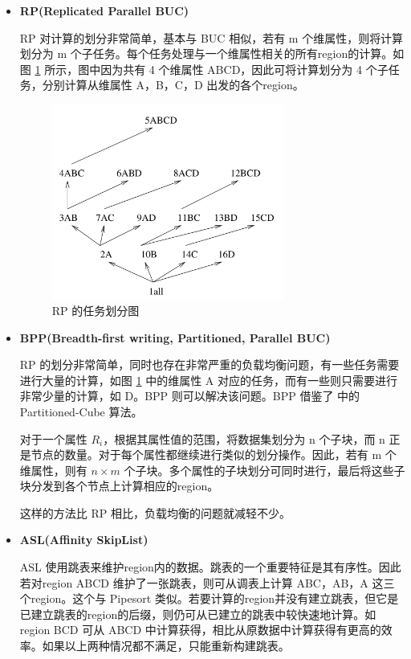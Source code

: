 \begin{itemize}

\item \textbf{RP(Replicated Parallel BUC)}

RP 对计算的划分非常简单，基本与 BUC 相似，若有 m 个维属性，则将计算划分为 m 个子任务。每个任务处理与一个维属性相关的所有region的计算。如图 \ref{cluster_rp} 所示，图中因为共有 4 个维属性 ABCD，因此可将计算划分为 4 个子任务，分别计算从维属性 A，B，C，D 出发的各个region。

\begin{figure}[!htb]
\centering\includegraphics[width=3in]{picture/ch_current_research/cluster_rp} 
\caption{RP 的任务划分图}\label{cluster_rp} 
\end{figure} 

\item \textbf{BPP(Breadth-first writing, Partitioned, Parallel BUC)}

RP 的划分非常简单，同时也存在非常严重的负载均衡问题，有一些任务需要进行大量的计算，如图 \ref{cluster_rp} 中的维属性 A 对应的任务，而有一些则只需要进行非常少量的计算，如 D。BPP 则可以解决该问题。BPP 借鉴了 \cite{ross1997fast} 中的 Partitioned-Cube 算法。

对于一个属性 ${R}_{i}$，根据其属性值的范围，将数据集划分为 n 个子块，而 n 正是节点的数量。对于每个属性都继续进行类似的划分操作。因此，若有 m 个维属性，则有 $n \times m$ 个子块。多个属性的子块划分可同时进行，最后将这些子块分发到各个节点上计算相应的region。

这样的方法比 RP 相比，负载均衡的问题就减轻不少。

\item \textbf{ASL(Affinity SkipList)}

ASL 使用跳表来维护region内的数据。跳表的一个重要特征是其有序性。因此若对region ABCD 维护了一张跳表，则可从调表上计算 ABC，AB，A 这三个region。这个与 Pipesort 类似。若要计算的region并没有建立跳表，但它是已建立跳表的region的后缀，则仍可从已建立的跳表中较快速地计算。如region BCD 可从 ABCD 中计算获得，相比从原数据中计算获得有更高的效率。如果以上两种情况都不满足，只能重新构建跳表。
 

\end{itemize}
